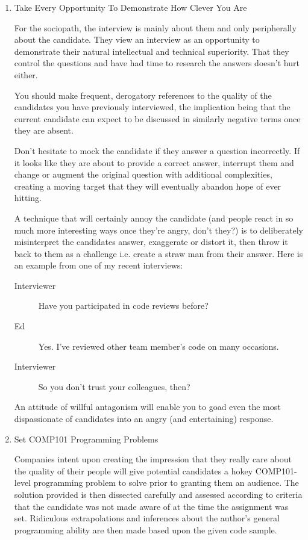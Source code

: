 \documentclass{article}
\begin{document}
\begin{enumerate}
\item Take Every Opportunity To Demonstrate How Clever You Are
\label{sec:orgheadline66}

For the sociopath, the interview is mainly about them and only
peripherally about the candidate. They view an interview as an
opportunity to demonstrate their natural intellectual and technical
superiority. That they control the questions and have had time to
research the answers doesn't hurt either.

You should make frequent, derogatory references to the quality of the
candidates you have previously interviewed, the implication being that
the current candidate can expect to be discussed in similarly negative
terms once they are absent.

Don't hesitate to mock the candidate if they answer a question
incorrectly. If it looks like they are about to provide a correct
answer, interrupt them and change or augment the original question with
additional complexities, creating a moving target that they will
eventually abandon hope of ever hitting.

A technique that will certainly annoy the candidate (and people react in
so much more interesting ways once they're angry, don't they?) is to
deliberately misinterpret the candidates answer, exaggerate or distort
it, then throw it back to them as a challenge i.e. create a straw man
from their answer. Here is an example from one of my recent interviews:

\begin{description}
\item[{Interviewer}] Have you participated in code reviews before?
\item[{Ed}] Yes. I've reviewed other team member's code on many occasions.
\item[{Interviewer}] So you don't trust your colleagues, then?
\end{description}

An attitude of willful antagonism will enable you to goad even the most
dispassionate of candidates into an angry (and entertaining) response.

\item Set COMP101 Programming Problems
\label{sec:orgheadline67}

Companies intent upon creating the impression that they really care
about the quality of their people will give potential candidates a hokey
COMP101-level programming problem to solve prior to granting them an
audience. The solution provided is then dissected carefully and assessed
according to criteria that the candidate was not made aware of at the
time the assignment was set. Ridiculous extrapolations and inferences
about the author's general programming ability are then made based upon
the given code sample.


\end{enumerate}
\end{document}
